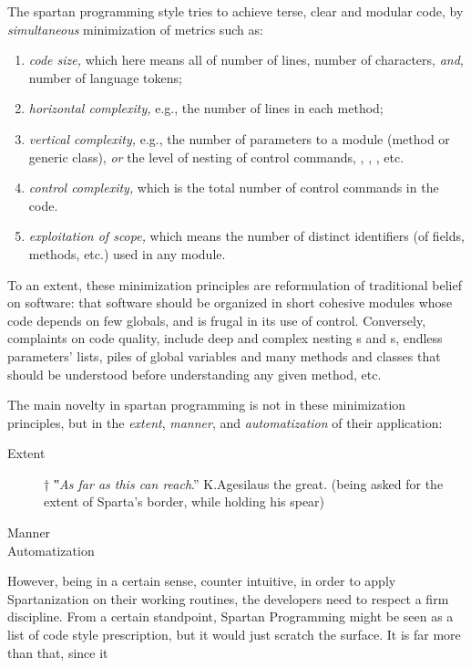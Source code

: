 The spartan programming style tries to achieve terse, clear and modular code,
by \textit{simultaneous} minimization of metrics such as:
\begin{enumerate}
  \item \textit{code size,} which here means all of number of lines, number of
    characters, \emph{and}, number of language tokens;
  \item \textit{horizontal complexity,} e.g., the number of lines in each
    method;
  \item \textit{vertical complexity,} e.g., the number of parameters to a
    module (method or generic class), \emph{or} the level of nesting of control
    commands, , , , etc.
  \item \textit{control complexity,} which is the total number of control
    commands in the code.
  \item \textit{exploitation of scope,} which means the number of distinct
    identifiers (of fields, methods, etc.) used in any module.
\end{enumerate}

To an extent, these minimization principles are reformulation of traditional
belief on software: that software should be organized in short cohesive modules
whose code depends on few globals, and is frugal in its use of control.
Conversely, complaints on code quality, include deep and complex nesting
s and s, endless parameters' lists, piles of global variables
and many methods and classes that should be understood before understanding any
given method, etc.

The main novelty in spartan programming is not in these minimization
principles, but in the \emph{extent}, \emph{manner}, and \emph{automatization}
of their application:

\begin{description}
  \item[Extent]†{%
     ‟\emph{As far as this can reach}.” K.Agesilaus the great.
    (being asked for the extent of Sparta's border, while holding his spear)
  }
  \item[Manner]
  \item[Automatization]
\end{description}

However, being in a certain sense, counter intuitive, in order to apply
Spartanization on their working routines, the developers need to respect a firm
discipline. From a certain standpoint, Spartan Programming might be seen as a
list of code style prescription, but it would just scratch the surface. It is
far more than that, since it

